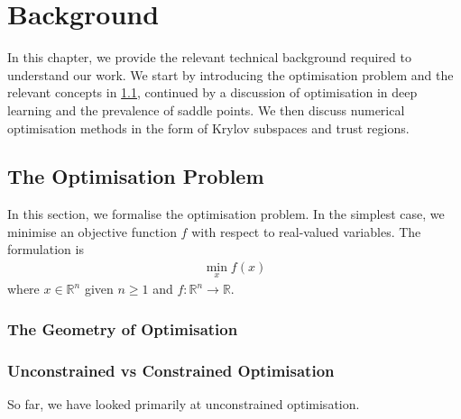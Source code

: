 \chapter{Background}
\label{chap:background}

In this chapter, we provide the relevant technical background required to understand our work. We start by introducing the optimisation problem and the relevant concepts in \cref{sec:optimisation_problem}, continued by a discussion of optimisation in deep learning and the prevalence of saddle points. We then discuss numerical optimisation methods in the form of Krylov subspaces and trust regions.

\section{The Optimisation Problem}
\label{sec:optimisation_problem}

In this section, we formalise the optimisation problem. In the simplest case, we minimise an objective function $f$ with respect to real-valued variables. The formulation is 
\begin{align}
    \min_{x} f(x)
\end{align}
where $x \in \mathbb{R}^n$ given $n \geq 1$ and $f: \mathbb{R}^n \to \mathbb{R}$.


\subsection{The Geometry of Optimisation}
\label{sec:geometry_of_optimisation}

\subsection{Unconstrained vs Constrained Optimisation}
So far, we have looked primarily at unconstrained optimisation. 